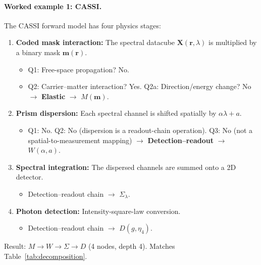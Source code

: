 \paragraph{Worked example 1: CASSI.}
The CASSI forward model has four physics stages:
\begin{enumerate}
  \item \textbf{Coded mask interaction:} The spectral datacube $\mathbf{X}(\mathbf{r}, \lambda)$ is multiplied by a binary mask $\mathbf{m}(\mathbf{r})$.
  \begin{itemize}
    \item Q1: Free-space propagation? No.
    \item Q2: Carrier--matter interaction? Yes. Q2a: Direction/energy change? No $\to$ \textbf{Elastic} $\to$ $M(\mathbf{m})$.
  \end{itemize}
  \item \textbf{Prism dispersion:} Each spectral channel is shifted spatially by $\alpha\lambda + a$.
  \begin{itemize}
    \item Q1: No. Q2: No (dispersion is a readout-chain operation). Q3: No (not a spatial-to-measurement mapping) $\to$ \textbf{Detection--readout} $\to$ $W(\alpha, a)$.
  \end{itemize}
  \item \textbf{Spectral integration:} The dispersed channels are summed onto a 2D detector.
  \begin{itemize}
    \item Detection--readout chain $\to$ $\Sigma_\lambda$.
  \end{itemize}
  \item \textbf{Photon detection:} Intensity-square-law conversion.
  \begin{itemize}
    \item Detection--readout chain $\to$ $D(g, \eta_4)$.
  \end{itemize}
\end{enumerate}
Result: $M \to W \to \Sigma \to D$ (4 nodes, depth 4). Matches Table~\ref{tab:decomposition}.

